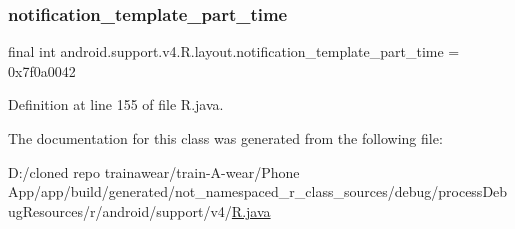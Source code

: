 \subsubsection{\texorpdfstring{notification\_template\_part\_time}{notification\_template\_part\_time}}
{\footnotesize\ttfamily final int android.\+support.\+v4.\+R.\+layout.\+notification\+\_\+template\+\_\+part\+\_\+time = 0x7f0a0042\hspace{0.3cm}{\ttfamily [static]}}



Definition at line 155 of file R.\+java.



The documentation for this class was generated from the following file\+:\begin{DoxyCompactItemize}
\item 
D\+:/cloned repo trainawear/train-\/\+A-\/wear/\+Phone App/app/build/generated/not\+\_\+namespaced\+\_\+r\+\_\+class\+\_\+sources/debug/process\+Debug\+Resources/r/android/support/v4/\mbox{\hyperlink{process_debug_resources_2r_2android_2support_2v4_2_r_8java}{R.\+java}}\end{DoxyCompactItemize}
